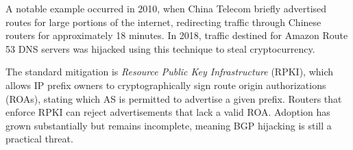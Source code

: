 A notable example occurred in 2010, when China Telecom briefly advertised routes for large portions of the internet, redirecting traffic through Chinese routers for approximately 18 minutes. In 2018, traffic destined for Amazon Route 53 DNS servers was hijacked using this technique to steal cryptocurrency.

The standard mitigation is \emph{Resource Public Key Infrastructure} (RPKI), which allows IP prefix owners to cryptographically sign route origin authorizations (ROAs), stating which AS is permitted to advertise a given prefix. Routers that enforce RPKI can reject advertisements that lack a valid ROA. Adoption has grown substantially but remains incomplete, meaning BGP hijacking is still a practical threat.





